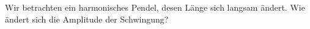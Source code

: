 \begin{Exercise}[label = adi, title = Pendel, difficulty = 5, origin = Aaron Wild]
	Wir betrachten ein harmonisches Pendel, desen Länge sich langsam ändert. Wie ändert sich die Amplitude der Schwingung?
\end{Exercise}